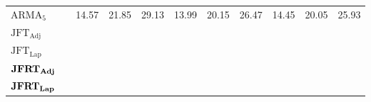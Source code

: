 \documentclass[a4paper, 12pt]{article}
\begin{document}
\begin{table}[ht]
{\begin{tabular}{@{}llrrrrrrrrr@{}}
			\(\text{ARMA}_5\)                              &                                       & 14.57                         & 21.85                         & 29.13                          & 13.99    & 20.15    & 26.47    & 14.45    & 20.05    & 25.93    \\
			\(\text{JFT}_{\text{Adj}}\)                    &                                       &                               &                               &                                &          &          &          &          &          &          \\
			\(\text{JFT}_{\text{Lap}}\)                    &                                       &                               &                               &                                &          &          &          &          &          &          \\
			\(\text{\textbf{JFRT}}_{\text{\textbf{Adj}}}\) &                                       &                               &                               &                                &          &          &          &          &          &          \\
			\(\text{\textbf{JFRT}}_{\text{\textbf{Lap}}}\) &                                       &                               &                               &                                &          &          &          &          &          &          \\ \bottomrule
		\end{tabular}
	}
\end{table}
\end{document}
